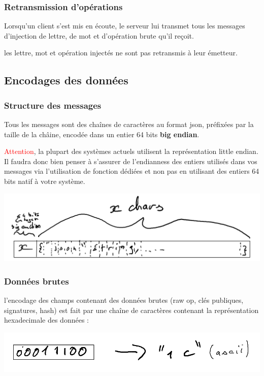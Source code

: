 \documentclass{article}
\begin{document}
 \subsubsection{Retransmission d'opérations}
 \label{sec:forward}
 Lorsqu'un client s'est mis en écoute, le serveur lui transmet tous
 les messages d'injection de lettre, de mot et d'opération brute qu'il
 reçoit.

 les lettre, mot et opération injectés ne sont pas retransmis à leur
 émetteur.

 \subsection{Encodages des données}
 \label{sec:encodages}

 \subsubsection{Structure des messages}
 \label{sec:struct-des-mess}

 Tous les messages sont des chaînes de caractères au format json,
 préfixées par la taille de la châine, encodée dans un entier 64 bits
 \textbf{big endian}.

 \textcolor{red}{Attention}, la plupart des systèmes actuels
 utilisent la représentation little endian. Il faudra donc bien penser
 à s'assurer de l'endianness des entiers utilisés dans vos messages
 via l'utilisation de fonction dédiées et non pas en utilisant des
 entiers 64 bits natif à votre système.

 \includegraphics{images/encodage_message.png}

 \subsubsection{Données brutes}
 \label{sec:enc-donnees-brutes}

 l'encodage des champs contenant des données brutes (raw op, clés
 publiques, signatures, hash) est fait par une chaîne de caractères
 contenant la représentation hexadecimale des données :

 \includegraphics{images/encodage_octets.png}
\end{document}
